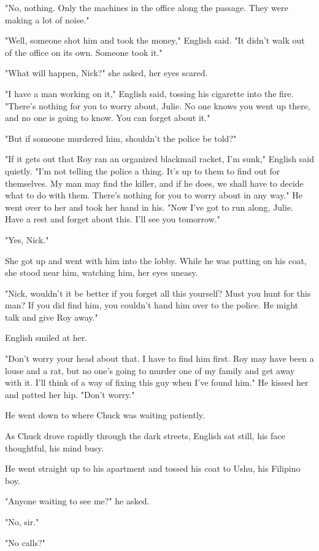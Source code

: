 \documentclass{novel}
\begin{document}
"No, nothing. Only the machines in the office along the passage. They were making a lot of noise."

"Well, someone shot him and took the money," English said. "It didn't walk out of the office on its own. Someone took it."

"What will happen, Nick?" she asked, her eyes scared.

"I have a man working on it," English said, tossing his cigarette into the fire. "There's nothing for you to worry about, Julie. No one knows you went up there, and no one is going to know. You can forget about it."

"But if someone murdered him, shouldn't the police be told?"

"If it gets out that Roy ran an organized blackmail racket, I'm sunk," English said quietly. "I'm not telling the police a thing. It's up to them to find out for themselves. My man may find the killer, and if he does, we shall have to decide what to do with them. There's nothing for you to worry about in any way." He went over to her and took her hand in his. "Now I've got to run along, Julie. Have a rest and forget about this. I'll see you tomorrow."

"Yes, Nick."

She got up and went with him into the lobby. While he was putting on his coat, she stood near him, watching him, her eyes uneasy.

"Nick, wouldn't it be better if you forget all this yourself? Must you hunt for this man? If you did find him, you couldn't hand him over to the police. He might talk and give Roy away."

English smiled at her.

"Don't worry your head about that. I have to find him first. Roy may have been a louse and a rat, but no one's going to murder one of my family and get away with it. I'll think of a way of fixing this guy when I've found him." He kissed her and patted her hip. "Don't worry."

He went down to where Chuck was waiting patiently.

As Chuck drove rapidly through the dark streets, English sat still, his face thoughtful, his mind busy.

He went straight up to his apartment and tossed his coat to Ushu, his Filipino boy.

"Anyone waiting to see me?" he asked.

"No, sir."

"No calls?"
\end{document}
